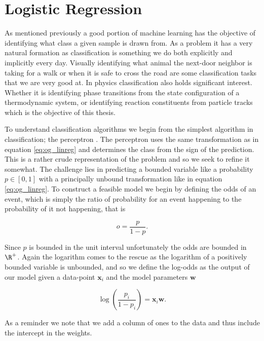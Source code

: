 
\section{Logistic Regression}\label{sec:LogReg}

As mentioned previously a good portion of machine learning has the objective of identifying what class a given sample is drawn from. As a problem it has a very natural formation as classification is something we do both explicitly and implicitly every day. Visually identifying what animal the next-door neighbor is taking for a walk or when it is safe to cross the road are some classification tasks that we are very good at. In physics classification also holds significant interest. Whether it is identifying phase transitions from the state configuration of a thermodynamic system, or identifying reaction constituents from particle tracks which is the objective of this thesis.

To understand classification algorithms we begin from the simplest algorithm in classification; the perceptron \cite{Rosenblatt1958}. The perceptron uses the same transformation as in equation \ref{eq:og_linreg} and determines the class from the sign of the prediction. This is a rather crude representation of the problem and so we seek to refine it somewhat. The challenge lies in predicting a bounded variable like a probability $p \in [0,1]$ with a principally unbound transformation like in equation \ref{eq:og_linreg}. To construct a feasible model we begin by defining the odds of an event, which is simply the ratio of probability for an event happening to the probability of it not happening, that is 

\begin{equation}\label{eq:odds}
o = \frac{p}{1-p}.
\end{equation}

\noindent Since $p$ is bounded in the unit interval unfortunately the odds are bounded in $\R^+$. Again the logarithm comes to the rescue as the logarithm of a positively bounded variable is unbounded, and so we define the log-odds as the output of our model given a data-point $\mathbf{x}_i$ and the model parameters $\mathbf{w}$

\begin{equation}\label{eq:log_odds}
\log \left(\frac{p_i}{1-p_i}\right) = \mathbf{x}_i\mathbf{w}. 
\end{equation} 

\noindent As a reminder we note that we add a column of ones to the data and thus include the intercept in the weights. 

